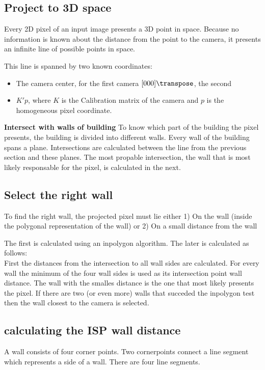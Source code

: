 \subsection{Project to 3D space}
Every 2D pixel of an input image presents a 3D point in space. Because no
information is known about the distance from the point to the camera, it
presents an infinite line of possible points in space.


This line is spanned by two known coordinates:
\begin{itemize}
\item The camera center, for the first camera $[0 0 0]\transpose$, the second %
\item $K'p$, where $K$ is the Calibration matrix of the camera and $p$ is the homogeneous pixel coordinate.
\end{itemize}


\textbf{Intersect with walls of building}
To know which part of the building the pixel presents, the building is divided into different walls.
Every wall of the building spans a plane. Intersections are calculated between the line from the previous section and these planes.
The most propable intersection, the wall that is most likely responsable for the pixel, is calculated in the next.

\subsection{Select the right wall}
To find the right wall, the projected pixel must lie either
1) On the wall (inside the polygonal representation of the wall)
or
2) On a small distance from the wall

The first is calculated using an inpolygon algorithm.
The later is calculated as follows:
\\
First the distances from the intersection to all wall sides are calculated. For every wall the minimum of the four wall sides is used as its intersection point wall distance.
The wall with the smalles distance is the one that most likely presents the pixel. If there are two (or even more) walls that succeded the inpolygon test then the wall closest to the camera is selected.

\subsection{calculating the ISP wall distance}
A wall consists of four corner points. Two cornerpoints connect a line segment which represents a side of a wall. There are four line segments.

